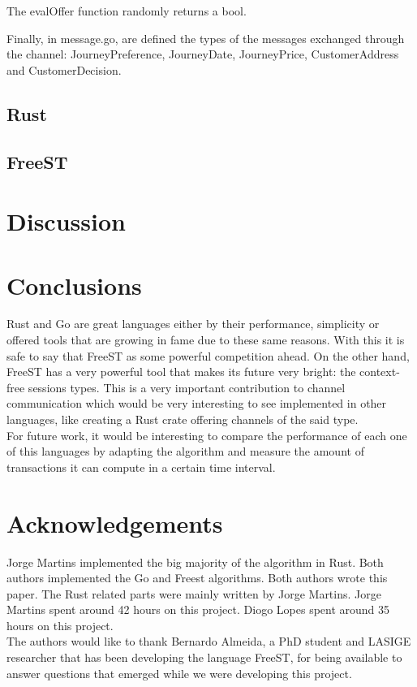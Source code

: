 \documentclass[runningheads]{llncs}
\begin{document}
The evalOffer function randomly returns a bool. 

Finally, in message.go, are defined the types of the messages exchanged through the channel: JourneyPreference, JourneyDate, JourneyPrice, CustomerAddress and CustomerDecision. 
\subsection{Rust}
\lipsum[1]
\subsection{FreeST}
\lipsum[1]
\section{Discussion}
\section{Conclusions}
Rust and Go are great languages either by their performance, simplicity or offered tools that are growing in fame due to these same reasons. With this it is safe to say that FreeST as some powerful competition ahead. On the other hand, FreeST has a very powerful tool that makes its future very bright: the context-free sessions types.
This is a very important contribution to channel communication which would be very interesting to see implemented in other languages, like creating a Rust crate offering channels of the said type.
\\For future work, it would be interesting to compare the performance of each one of this languages by adapting the algorithm and measure the amount of transactions it can compute in a certain time interval.
\section*{Acknowledgements}
Jorge Martins implemented the big majority of the algorithm in Rust. Both authors implemented the Go and Freest algorithms.
Both authors wrote this paper. The Rust related parts were mainly written by Jorge Martins.
Jorge Martins spent around 42 hours on this project. Diogo Lopes spent around 35 hours on this project.\\
The authors would like to thank Bernardo Almeida, a PhD student and LASIGE researcher that has been developing the language FreeST, for being available to answer questions that emerged while we were developing this project.


\end{document}
